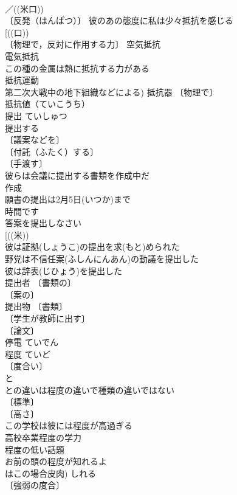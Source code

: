 \documentclass[8pt]{extreport}
\begin{document}
\begin{CJK}{UTF8}{min}
\\	／((米口)) 
\\	〔反発（はんぱつ）〕 彼のあの態度に私は少々抵抗を感じる 
\\	[((口))
\\	〔物理で，反対に作用する力〕 空気抵抗 
\\	電気抵抗 
\\	この種の金属は熱に抵抗する力がある 
\\	抵抗運動 
\\	第二次大戦中の地下組織などによる) 抵抗器 〔物理で〕
\\	抵抗値（ていこうち） 
\\	提出	ていしゅつ	
\\	提出する 
\\	〔議案などを〕
\\	〔付託（ふたく）する〕
\\	〔手渡す〕
\\	彼らは会議に提出する書類を作成中だ 
\\	作成　
\\	願書の提出は2月5日(いつか)まで 
\\	時間です
\\	答案を提出しなさい 
\\	[((米))
\\	彼は証拠(しょうこ)の提出を求(もと)められた 
\\	野党は不信任案(ふしんにんあん)の動議を提出した 
\\	彼は辞表(じひょう)を提出した 
\\	提出者 〔書類の〕
\\	〔案の〕
\\	提出物 〔書類〕
\\	〔学生が教師に出す〕
\\	〔論文〕
\\	停電	ていでん	
\\	程度	ていど	
\\	〔度合い〕
\\	と
\\	との違いは程度の違いで種類の違いではない 
\\	〔標準〕
\\	〔高さ〕
\\	この学校は彼には程度が高過ぎる 
\\	高校卒業程度の学力 
\\	程度の低い話題 
\\	お前の頭の程度が知れるよ 
\\	はこの場合皮肉) しれる　
\\	〔強弱の度合〕

\end{CJK}
\end{document}
